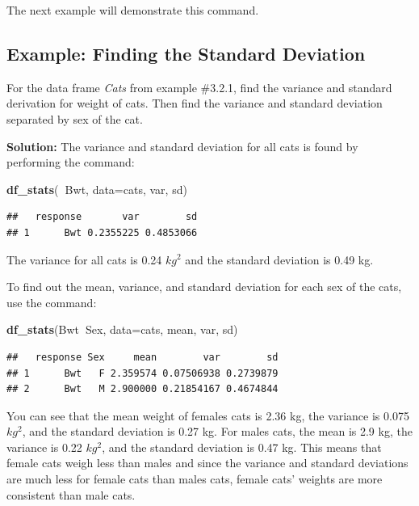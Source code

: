 \documentclass[
]{book}
\newenvironment{Shaded}{\begin{snugshade}}{\end{snugshade}}
\newcommand{\DataTypeTok}[1]{\textcolor[rgb]{0.13,0.29,0.53}{#1}}
\newcommand{\KeywordTok}[1]{\textcolor[rgb]{0.13,0.29,0.53}{\textbf{#1}}}
\newcommand{\NormalTok}[1]{#1}
\newcommand{\OperatorTok}[1]{\textcolor[rgb]{0.81,0.36,0.00}{\textbf{#1}}}
\begin{document}
The next example will demonstrate this command.

\hypertarget{example-finding-the-standard-deviation}{%
\subsection{Example: Finding the Standard Deviation}\label{example-finding-the-standard-deviation}}

For the data frame \emph{Cats} from example \#3.2.1, find the variance and standard derivation for weight of cats. Then find the variance and standard deviation separated by sex of the cat.

\textbf{Solution:}
The variance and standard deviation for all cats is found by performing the command:

\begin{Shaded}
\begin{Highlighting}[]
\KeywordTok{df_stats}\NormalTok{(}\OperatorTok{~}\NormalTok{Bwt, }\DataTypeTok{data=}\NormalTok{cats, var, sd)}
\end{Highlighting}
\end{Shaded}

\begin{verbatim}
##   response       var        sd
## 1      Bwt 0.2355225 0.4853066
\end{verbatim}

The variance for all cats is 0.24 \(kg^2\) and the standard deviation is 0.49 kg.

To find out the mean, variance, and standard deviation for each sex of the cats, use the command:

\begin{Shaded}
\begin{Highlighting}[]
\KeywordTok{df_stats}\NormalTok{(Bwt}\OperatorTok{~}\NormalTok{Sex, }\DataTypeTok{data=}\NormalTok{cats, mean, var, sd)}
\end{Highlighting}
\end{Shaded}

\begin{verbatim}
##   response Sex     mean        var        sd
## 1      Bwt   F 2.359574 0.07506938 0.2739879
## 2      Bwt   M 2.900000 0.21854167 0.4674844
\end{verbatim}

You can see that the mean weight of females cats is 2.36 kg, the variance is 0.075 \(kg^2\), and the standard deviation is 0.27 kg. For males cats, the mean is 2.9 kg, the variance is 0.22 \(kg^2\), and the standard deviation is 0.47 kg. This means that female cats weigh less than males and since the variance and standard deviations are much less for female cats than males cats, female cats' weights are more consistent than male cats.
\end{document}
